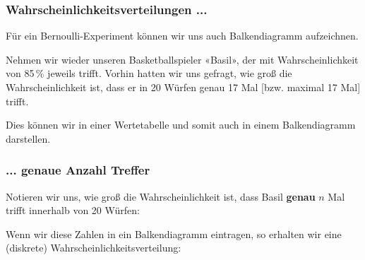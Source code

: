 
\subsubsection{Wahrscheinlichkeitsverteilungen ...}

Für ein Bernoulli-Experiment können wir uns auch Balkendiagramm aufzeichnen.

Nehmen wir wieder unseren Basketballspieler «Basil», der mit Wahrscheinlichkeit von 85\,\% jeweils trifft. Vorhin hatten wir uns gefragt, wie groß die Wahrscheinlichkeit ist, dass er in 20 Würfen genau 17 Mal [bzw. maximal 17 Mal] trifft.

Dies können wir in einer Wertetabelle und somit auch in einem Balkendiagramm darstellen.
\newpage


\subsubsection*{... genaue Anzahl Treffer}
Notieren wir uns, wie groß die Wahrscheinlichkeit ist, dass Basil \textbf{genau} $n$ Mal trifft innerhalb von 20 Würfen:



Wenn wir diese Zahlen in ein Balkendiagramm eintragen, so erhalten wir
eine (diskrete) Wahrscheinlichkeitsverteilung:



